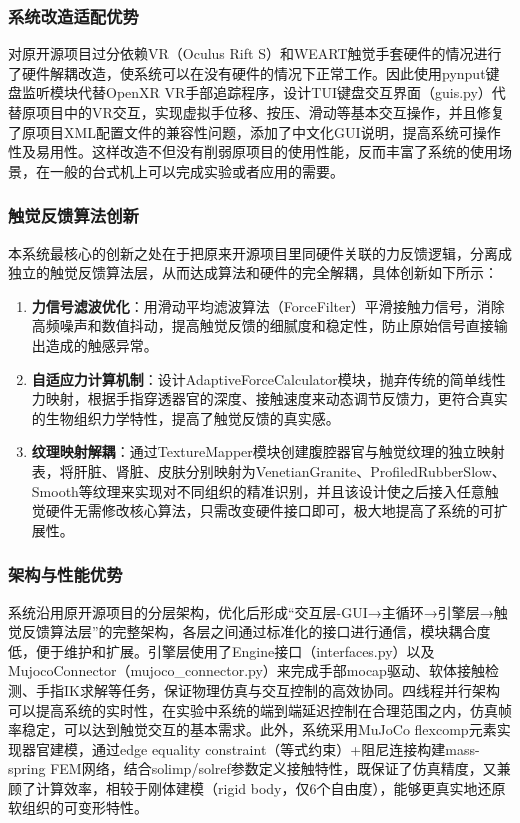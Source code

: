 \subsubsection{系统改造适配优势}
对原开源项目过分依赖VR（Oculus Rift S）和WEART触觉手套硬件的情况进行了硬件解耦改造，使系统可以在没有硬件的情况下正常工作。因此使用pynput键盘监听模块代替OpenXR VR手部追踪程序，设计TUI键盘交互界面（guis.py）代替原项目中的VR交互，实现虚拟手位移、按压、滑动等基本交互操作，并且修复了原项目XML配置文件的兼容性问题，添加了中文化GUI说明，提高系统可操作性及易用性。这样改造不但没有削弱原项目的使用性能，反而丰富了系统的使用场景，在一般的台式机上可以完成实验或者应用的需要。

\subsubsection{触觉反馈算法创新}
本系统最核心的创新之处在于把原来开源项目里同硬件关联的力反馈逻辑，分离成独立的触觉反馈算法层，从而达成算法和硬件的完全解耦，具体创新如下所示：

\begin{enumerate}
    \item \textbf{力信号滤波优化}：用滑动平均滤波算法（ForceFilter）平滑接触力信号，消除高频噪声和数值抖动，提高触觉反馈的细腻度和稳定性，防止原始信号直接输出造成的触感异常。
    
    \item \textbf{自适应力计算机制}：设计AdaptiveForceCalculator模块，抛弃传统的简单线性力映射，根据手指穿透器官的深度、接触速度来动态调节反馈力，更符合真实的生物组织力学特性，提高了触觉反馈的真实感。
    
    \item \textbf{纹理映射解耦}：通过TextureMapper模块创建腹腔器官与触觉纹理的独立映射表，将肝脏、肾脏、皮肤分别映射为VenetianGranite、ProfiledRubberSlow、Smooth等纹理来实现对不同组织的精准识别，并且该设计使之后接入任意触觉硬件无需修改核心算法，只需改变硬件接口即可，极大地提高了系统的可扩展性。
\end{enumerate}

\subsubsection{架构与性能优势}
系统沿用原开源项目的分层架构，优化后形成“交互层-GUI→主循环→引擎层→触觉反馈算法层”的完整架构，各层之间通过标准化的接口进行通信，模块耦合度低，便于维护和扩展。引擎层使用了Engine接口（interfaces.py）以及MujocoConnector（mujoco\_connector.py）来完成手部mocap驱动、软体接触检测、手指IK求解等任务，保证物理仿真与交互控制的高效协同。四线程并行架构可以提高系统的实时性，在实验中系统的端到端延迟控制在合理范围之内，仿真帧率稳定，可以达到触觉交互的基本需求。此外，系统采用MuJoCo flexcomp元素实现器官建模，通过edge equality constraint（等式约束）+阻尼连接构建mass-spring FEM网络，结合solimp/solref参数定义接触特性，既保证了仿真精度，又兼顾了计算效率，相较于刚体建模（rigid body，仅6个自由度），能够更真实地还原软组织的可变形特性。

